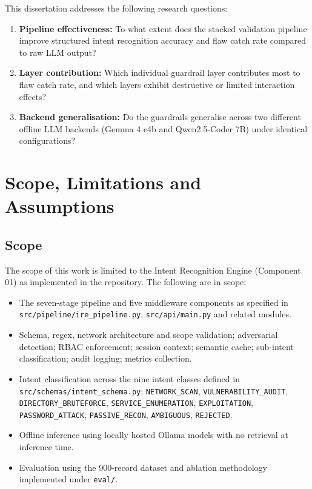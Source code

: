 This dissertation addresses the following research questions:

\begin{enumerate}[label=RQ\arabic*:]
  \item \textbf{Pipeline effectiveness:} To what extent does the stacked validation pipeline improve structured intent recognition accuracy and flaw catch rate compared to raw LLM output?
  \item \textbf{Layer contribution:} Which individual guardrail layer contributes most to flaw catch rate, and which layers exhibit destructive or limited interaction effects?
  \item \textbf{Backend generalisation:} Do the guardrails generalise across two different offline LLM backends (Gemma 4 e4b and Qwen2.5-Coder 7B) under identical configurations?
\end{enumerate}

\section{Scope, Limitations and Assumptions}\label{sec:intro-scope}

\subsection{Scope}

The scope of this work is limited to the Intent Recognition Engine (Component 01) as implemented in the repository. The following are in scope:
\begin{itemize}
  \item The seven-stage pipeline and five middleware components as specified in \texttt{src/pipeline/ire\_pipeline.py}, \texttt{src/api/main.py} and related modules.
  \item Schema, regex, network architecture and scope validation; adversarial detection; RBAC enforcement; session context; semantic cache; sub-intent classification; audit logging; metrics collection.
  \item Intent classification across the nine intent classes defined in \texttt{src/schemas/intent\_schema.py}: \texttt{NETWORK\_SCAN}, \texttt{VULNERABILITY\_AUDIT}, \texttt{DIRECTORY\_BRUTEFORCE}, \texttt{SERVICE\_ENUMERATION}, \texttt{EXPLOITATION}, \texttt{PASSWORD\_ATTACK}, \texttt{PASSIVE\_RECON}, \texttt{AMBIGUOUS}, \texttt{REJECTED}.
  \item Offline inference using locally hosted Ollama models with no retrieval at inference time.
  \item Evaluation using the 900-record dataset and ablation methodology implemented under \texttt{eval/}.
\end{itemize}

